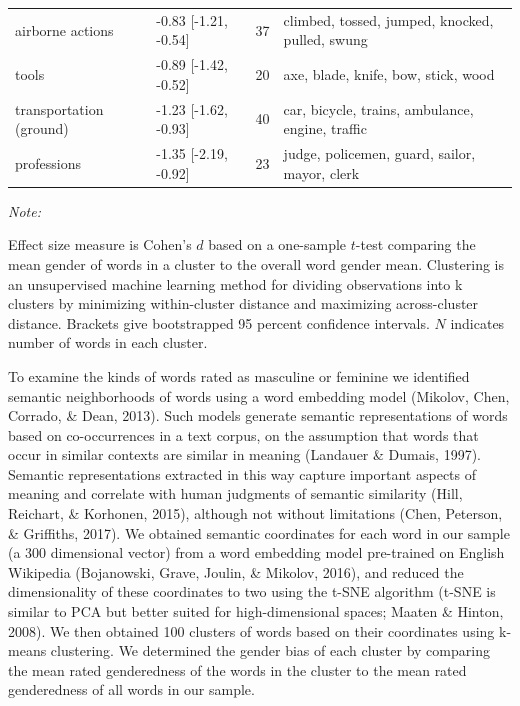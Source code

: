 \documentclass[
  english,
  ,man,floatsintext]{apa6}
\begin{document}
\begin{table}
{\begin{threeparttable}
\begin{tabular}[t]{llrl}
\hspace{1em}airborne actions & -0.83 [-1.21, -0.54] & 37 & climbed, tossed, jumped, knocked, pulled, swung\\
\hspace{1em}tools & -0.89 [-1.42, -0.52] & 20 & axe, blade, knife, bow, stick, wood\\
\hspace{1em}transportation (ground) & -1.23 [-1.62, -0.93] & 40 & car, bicycle, trains, ambulance, engine, traffic\\
\hspace{1em}professions & -1.35 [-2.19, -0.92] & 23 & judge, policemen, guard, sailor, mayor, clerk\\
\bottomrule
\end{tabular}
\begin{tablenotes}[para]
\item \textit{Note:} 
\item Effect size measure is Cohen's $d$ based on a one-sample $t$-test comparing the mean gender of words in a cluster to the overall word gender mean. Clustering is an unsupervised machine learning method for dividing observations into k clusters by minimizing within-cluster distance and maximizing across-cluster distance. Brackets give bootstrapped 95 percent confidence intervals. $N$ indicates number of words in each cluster.
\end{tablenotes}
\end{threeparttable}}
\end{table}

To examine the kinds of words rated as masculine or feminine we identified semantic neighborhoods of words using a word embedding model (Mikolov, Chen, Corrado, \& Dean, 2013). Such models generate semantic representations of words based on co-occurrences in a text corpus, on the assumption that words that occur in similar contexts are similar in meaning (Landauer \& Dumais, 1997). Semantic representations extracted in this way capture important aspects of meaning and correlate with human judgments of semantic similarity (Hill, Reichart, \& Korhonen, 2015), although not without limitations (Chen, Peterson, \& Griffiths, 2017). We obtained semantic coordinates for each word in our sample (a 300 dimensional vector) from a word embedding model pre-trained on English Wikipedia (Bojanowski, Grave, Joulin, \& Mikolov, 2016), and reduced the dimensionality of these coordinates to two using the t-SNE algorithm (t-SNE is similar to PCA but better suited for high-dimensional spaces; Maaten \& Hinton, 2008). We then obtained 100 clusters of words based on their coordinates using k-means clustering. We determined the gender bias of each cluster by comparing the mean rated genderedness of the words in the cluster to the mean rated genderedness of all words in our sample.
\end{document}
